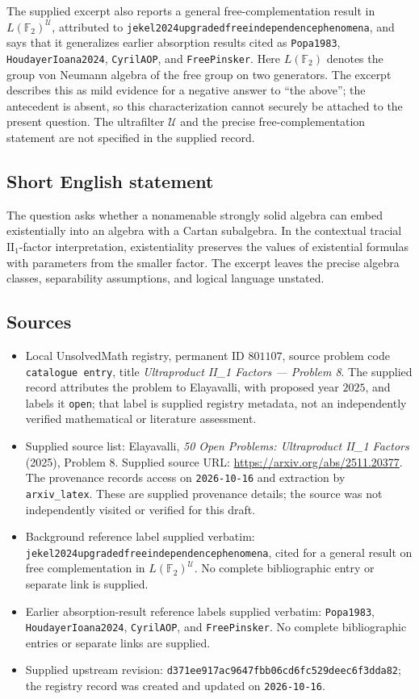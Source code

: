 \documentclass[11pt]{article}
\begin{document}
The supplied excerpt also reports a general free-complementation result in \(L(\mathbb F_2)^{\mathcal U}\), attributed to \texttt{jekel2024upgradedfreeindependencephenomena}, and says that it generalizes earlier absorption results cited as \texttt{Popa1983}, \texttt{HoudayerIoana2024}, \texttt{CyrilAOP}, and \texttt{FreePinsker}. Here \(L(\mathbb F_2)\) denotes the group von Neumann algebra of the free group on two generators. The excerpt describes this as mild evidence for a negative answer to ``the above''; the antecedent is absent, so this characterization cannot securely be attached to the present question. The ultrafilter \(\mathcal U\) and the precise free-complementation statement are not specified in the supplied record.
\subsection{Short English statement}
The question asks whether a nonamenable strongly solid algebra can embed existentially into an algebra with a Cartan subalgebra. In the contextual tracial \(\mathrm{II}_1\)-factor interpretation, existentiality preserves the values of existential formulas with parameters from the smaller factor. The excerpt leaves the precise algebra classes, separability assumptions, and logical language unstated.
\subsection{Sources}
\begin{itemize}
\item Local UnsolvedMath registry, permanent ID \(801107\), source problem code \texttt{catalogue entry}, title \emph{Ultraproduct II\_1 Factors --- Problem 8}. The supplied record attributes the problem to Elayavalli, with proposed year \(2025\), and labels it \texttt{open}; that label is supplied registry metadata, not an independently verified mathematical or literature assessment.
\item Supplied source list: Elayavalli, \emph{50 Open Problems: Ultraproduct II\_1 Factors} (2025), Problem 8. Supplied source URL: \url{https://arxiv.org/abs/2511.20377}. The provenance records access on \texttt{2026-10-16} and extraction by \texttt{arxiv\_latex}. These are supplied provenance details; the source was not independently visited or verified for this draft.
\item Background reference label supplied verbatim: \texttt{jekel2024upgradedfreeindependencephenomena}, cited for a general result on free complementation in \(L(\mathbb F_2)^{\mathcal U}\). No complete bibliographic entry or separate link is supplied.
\item Earlier absorption-result reference labels supplied verbatim: \texttt{Popa1983}, \texttt{HoudayerIoana2024}, \texttt{CyrilAOP}, and \texttt{FreePinsker}. No complete bibliographic entries or separate links are supplied.
\item Supplied upstream revision: \texttt{d371ee917ac9647fbb06cd6fc529deec6f3dda82}; the registry record was created and updated on \texttt{2026-10-16}.
\end{itemize}
\end{document}

